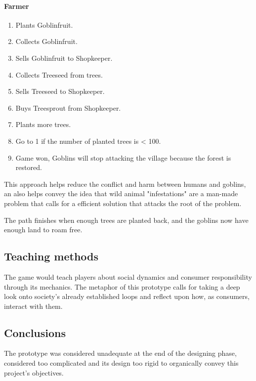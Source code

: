 \paragraph{Farmer}
\begin{enumerate}
	\item Plants Goblinfruit.
	\item Collects Goblinfruit.
	\item Sells Goblinfruit to Shopkeeper.
	\item Collects Treeseed from trees.
	\item Sells Treeseed to Shopkeeper.
	\item Buys Treesprout from Shopkeeper.
	\item Plants more trees.
	\item Go to 1 if the number of planted trees is < 100.
	\item Game won, Goblins will stop attacking the village because the forest is restored.
\end{enumerate}

This approach helps reduce the conflict and harm between humans and goblins,
an also helps convey the idea that wild animal "infestations" are a man-made
problem that calls for a efficient solution that attacks the root of the
problem.

The path finishes when enough trees are planted back, and the goblins
now have enough land to roam free.

\subsection{Teaching methods}
The game would teach players about social dynamics and consumer responsibility through its mechanics. The metaphor of this prototype calls for taking a deep
look onto society's already established loops and reflect upon how, as consumers,
interact with them.

\subsection{Conclusions}
The prototype was considered unadequate at the end of the designing phase,
considered too complicated and its design too rigid to organically convey
this project's objectives.
